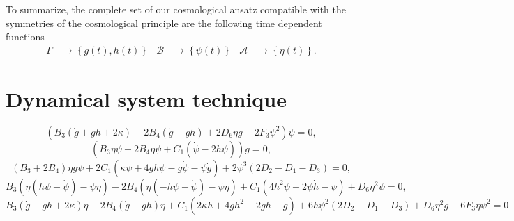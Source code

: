 \documentclass{article}
\begin{document}
To summarize, the complete set of our cosmological ansatz compatible with the symmetries of the cosmological principle are the following
time dependent functions
\begin{equation}
    \begin{aligned}
        \Gamma & \to \left\{g(t), h(t)\right\} & \mathcal{B} & \to \left\{\psi(t)\right\} & \mathcal{A} & \to \left\{\eta(t)\right\}.
    \end{aligned}
\end{equation}


\section{Dynamical system technique}
\label{sec: dynamical_system}

\begin{dmath}
    \label{Feq_1}
    \left(B_3\left(\dot{g} + gh + 2\kappa\right) - 2B_4\left(\dot{g} - gh\right) + 2D_6\eta g - 2F_3\psi^2\right)\psi = 0,
\end{dmath}
\begin{dmath}
    \label{Feq_2}
    \left(B_3\eta\psi -2B_4\eta\psi + C_1\left(\dot{\psi} - 2h\psi\right)\right)g = 0,
\end{dmath}
\begin{dmath}
    \label{Feq_3}
    \left(B_3 + 2B_4\right)\eta g\psi + 2C_1\left(\kappa\psi + 4gh\psi - g\dot{\psi} - \psi\dot{g}\right) + 2\psi^3\left(2D_2 - D_1 - D_3\right) = 0,
\end{dmath}
\begin{dmath}
    \label{Feq_4}
    B_3\left(\eta\left(h\psi - \dot{\psi}\right) -\psi\dot{\eta}\right) - 2B_4\left(\eta\left(-h\psi - \dot{\psi}\right) -\psi\dot{\eta}\right) 
    + C_1\left(4h^2\psi + 2\psi\dot{h} -\ddot{\psi}\right) + D_6\eta^2\psi = 0,
\end{dmath}
\begin{dmath}
    \label{Feq_5}
    B_3\left(\dot{g} + gh + 2\kappa\right)\eta - 2B_4\left(\dot{g} - gh\right)\eta + C_1\left(2\kappa h + 4gh^2 + 2g\dot{h} - \ddot{g}\right) +
    6h\psi^2\left(2D_2 - D_1 - D_3\right) + D_6 \eta^2 g - 6F_3\eta\psi^2 = 0
\end{dmath}
\end{document}
